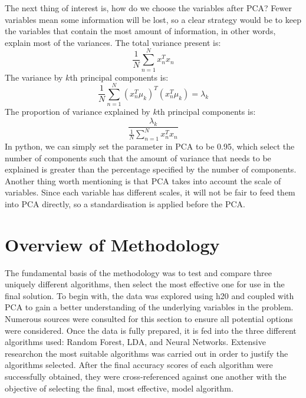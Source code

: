 \documentclass{article}
\begin{document}
The next thing of interest is, how do we choose the variables after PCA? Fewer variables mean some information will be lost, so a clear strategy would be to keep the variables that contain the most amount of information, in other words, explain most of the variances.
The total variance present is:
\begin{equation}
\frac{1}{N} \sum_{n=1}^{N} x_{n}^{T} x_{n}
\end{equation}
The variance by $k$th principal components is:
\begin{equation}
\frac{1}{N}\sum_{n=1}^{N}(x_{n}^{T}\mu_{k})^{T}(x_{n}^{T}\mu_{k})=\lambda_k
\end{equation}
The proportion of variance explained by $k$th principal components is:
\begin{equation}
\frac{\lambda_k}{\frac{1}{N}\sum_{n=1}^{N}x_{n}^{T}x_{n}}
\end{equation}
In python, we can simply set the parameter in PCA to be 0.95, which select the number of components such that the amount of variance that needs to be explained is greater than the percentage specified by the number of components.
Another thing worth mentioning is that PCA takes into account the scale of variables. Since each variable has different scales, it will not be fair to feed them into PCA directly, so a standardisation is applied before the PCA.


\section{Overview of Methodology}
The fundamental basis of the methodology was to test and compare three uniquely different algorithms, then select the most effective one for use in the final solution. To begin with, the data was explored using h20 and coupled with PCA to gain a better understanding of the underlying variables in the problem. Numerous sources\cite{source1,source2,source3} were consulted for this section to ensure all potential options were considered. Once the data is fully prepared, it is fed into the three different algorithms used: Random Forest, LDA, and Neural Networks. Extensive research\cite{h2o,research2}on the most suitable algorithms was carried out in order to justify the algorithms selected. After the final accuracy scores of each algorithm were successfully obtained, they were cross-referenced against one another with the objective of selecting the final, most effective,  model algorithm.\\
\end{document}
